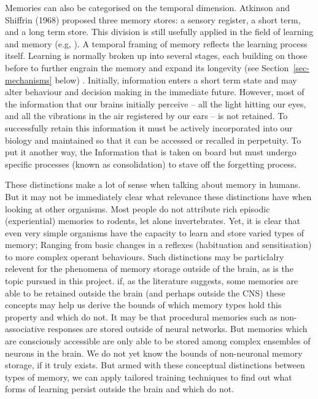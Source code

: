 \documentclass[
  letterpaper,
  DIV=11,
  numbers=noendperiod,
  oneside]{scrartcl}
\begin{document}
Memories can also be categorised on the temporal dimension. Atkinson and
Shiffrin (1968) proposed three memory stores: a sensory register, a
short term, and a long term store. This division is still usefully
applied in the field of learning and memory (e.g,
).
A temporal framing of memory reflects the learning process itself.
Learning is normally broken up into several stages, each building on
those before to further engrain the memory and expand its longevity (see
Section~\ref{sec-mechanisms} below) . Initially, information enters a
short term state and may alter behaviour and decision making in the
immediate future. However, most of the information that our brains
initially perceive -- all the light hitting our eyes, and all the
vibrations in the air registered by our ears -- is not retained. To
successfully retain this information it must be actively incorporated
into our biology and maintained so that it can be accessed or recalled
in perpetuity. To put it another way, the Information that is taken on
board but must undergo specific processes (known as consolidation) to
stave off the forgetting process.

These distinctions make a lot of sense when talking about memory in
humans. But it may not be immediately clear what relevance these
distinctions have when looking at other organisms. Most people do not
attribute rich episodic (experiential) memories to rodents, let alone
invertebrates. Yet, it is clear that even very simple organisms have the
capacity to learn and store varied types of memory; Ranging from basic
changes in a reflexes (habituation and sensitisation) to more complex
operant behaviours. Such distinctions may be particlalry relevent for
the phenomena of memory storage outside of the brain, as is the topic
pursued in this project. if, as the literature suggests, some memories
are able to be retained outside the brain (and perhaps outside the CNS)
these concepts may help us derive the bounds of which memory types hold
this property and which do not. It may be that procedural memories such
as non-associative responses are stored outside of neural networks. But
memories which are consciously accessible are only able to be stored
among complex ensembles of neurons in the brain. We do not yet know the
bounds of non-neuronal memory storage, if it truly exists. But armed
with these conceptual distinctions between types of memory, we can apply
tailored training techniques to find out what forms of learning persist
outside the brain and which do not.
\end{document}
